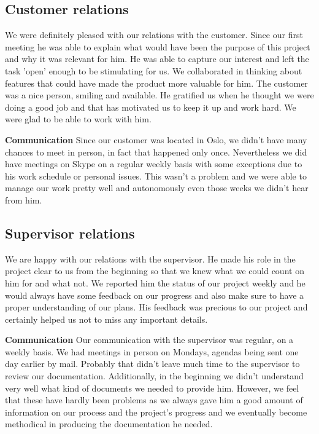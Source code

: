 \subsection{Customer relations}

We were definitely pleased with our relations with the customer.
Since our first meeting he was able to explain what would have been the purpose of this project and why
it was relevant for him. He was able to capture our interest and left the task 'open' enough to be stimulating for us.
We collaborated in thinking about features that could have made the product more valuable for him.
The customer was a nice person, smiling and available. He gratified us when he thought we were doing a good job and
that has motivated us to keep it up and work hard. We were glad to be able to work with him.

\textbf{Communication}\newline
Since our customer was located in Oslo, we didn't have many chances to meet in person,
in fact that happened only once. Nevertheless we did have meetings on Skype on a regular weekly basis
with some exceptions due to his work schedule or personal issues.
This wasn't a problem and we were able to manage our work pretty well and autonomously
even those weeks we didn't hear from him.

\subsection{Supervisor relations}

We are happy with our relations with the supervisor.
He made his role in the project clear to us from the beginning so that we knew
what we could count on him for and what not.
We reported him the status of our project weekly and he would always have some feedback
on our progress and also make sure to have a proper understanding of our plans.
His feedback was precious to our project and certainly helped us not to miss any important details.

\textbf{Communication}\newline
Our communication with the supervisor was regular, on a weekly basis.
We had meetings in person on Mondays, agendas being sent one day earlier by mail.
Probably that didn't leave much time to the supervisor to review our documentation.
Additionally, in the beginning we didn't understand very well what kind of documents
we needed to provide him.
However, we feel that these have hardly been problems as we always gave him a
good amount of information on our process and the project's progress and we eventually
become methodical in producing the documentation he needed.

